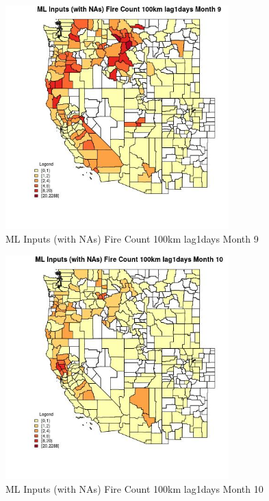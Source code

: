 \clearpage 

\begin{figure} 
\centering  
\includegraphics[width=0.77\textwidth]{Code_Outputs/Report_ML_input_PM25_Step4_part_e_de_duplicated_aves_compiled_2019-05-20wNAs_CountyFire_Count_100km_lag1daysmedianMonth9.jpg} 
\caption{\label{fig:Report_ML_input_PM25_Step4_part_e_de_duplicated_aves_compiled_2019-05-20wNAsCountyFire_Count_100km_lag1daysmedianMonth9}ML Inputs (with NAs) Fire Count 100km lag1days Month 9} 
\end{figure} 
 

\begin{figure} 
\centering  
\includegraphics[width=0.77\textwidth]{Code_Outputs/Report_ML_input_PM25_Step4_part_e_de_duplicated_aves_compiled_2019-05-20wNAs_CountyFire_Count_100km_lag1daysmedianMonth10.jpg} 
\caption{\label{fig:Report_ML_input_PM25_Step4_part_e_de_duplicated_aves_compiled_2019-05-20wNAsCountyFire_Count_100km_lag1daysmedianMonth10}ML Inputs (with NAs) Fire Count 100km lag1days Month 10} 
\end{figure} 
 

